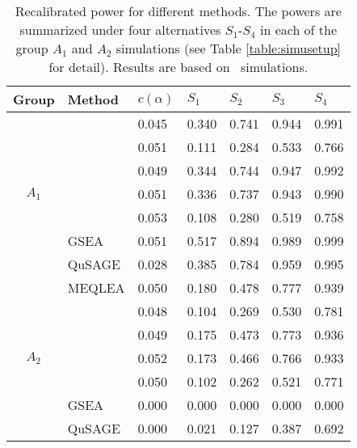 	\begin{table}[!ht]
		\centering
		\caption[Recalibrated power for different methods]{Recalibrated power for different 
		methods. The powers are 
		summarized
			under four alternatives $S_1$-$S_4$ in each of the group $A_1$ and $A_2$ simulations 
			(see Table
			\ref{table:simusetup} for detail). Results are based on \HowmanySimu~simulations.
		}\label{table:power}
		\begin{tabular}{cp{3cm}p{1.5cm}p{1.5cm}p{1.5cm}p{1.5cm}p{1.5cm}}
			\hline
			Group & Method &$c(\alpha)$	& $S_1$ & $S_2$ & $S_3$	&$S_4$  \\ 
			\hline
			\multirow{7}{*}{$A_1$} & \OurMethod & 0.045 & 0.340 & 0.741 & 0.944 & 0.991 \\ 
			&	\genr  & 0.051 & 0.111 & 0.284 & 0.533 & 0.766 \\ 
			&	\gent & 0.049 & 0.344 & 0.744 & 0.947 & 0.992 \\ 
			&	\CMT  & 0.051 & 0.336 & 0.737 & 0.943 & 0.990 \\ 
			&	\CMR  & 0.053 & 0.108 & 0.280 & 0.519 & 0.758 \\ 
			&	GSEA & 0.051 & 0.517 & 0.894 & 0.989 & 0.999 \\ 
			&	QuSAGE & 0.028 & 0.385 & 0.784 & 0.959 & 0.995 \\ 
		\hline
			\multirow{7}{*}{$A_2$} &	MEQLEA & 0.050 & 0.180 & 0.478 & 0.777 & 0.939 \\ 
			&		\genr & 0.048 & 0.104 & 0.269 & 0.530 & 0.781 \\ 
			&		\gent & 0.049 & 0.175 & 0.473 & 0.773 & 0.936 \\  
			&		\CMT & 0.052 & 0.173 & 0.466 & 0.766 & 0.933 \\ 
			&		\CMR & 0.050 & 0.102 & 0.262 & 0.521 & 0.771 \\ 
			&		GSEA & 0.000 & 0.000 & 0.000 & 0.000 & 0.000 \\ 
			&		QuSAGE  & 0.000 & 0.021 & 0.127 & 0.387 & 0.692 \\ 
		\hline
		\end{tabular}
	\end{table}
	
	
	
